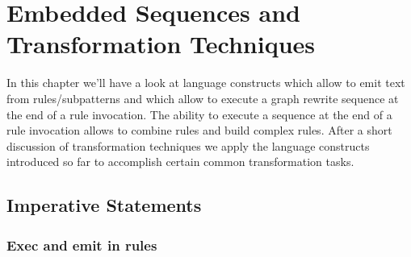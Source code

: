 \chapter{Embedded Sequences and Transformation Techniques}
\label{cha:imperativeandstate}

In this chapter we'll have a look at language constructs which allow to emit text from rules/subpatterns and which allow to execute a graph rewrite sequence at the end of a rule invocation.
The ability to execute a sequence at the end of a rule invocation allows to combine rules and build complex rules.
After a short discussion of transformation techniques we apply the language constructs introduced so far to accomplish certain common transformation tasks.

\section{Imperative Statements}
\label{sct:imperative}

\subsection{Exec and emit in rules}

